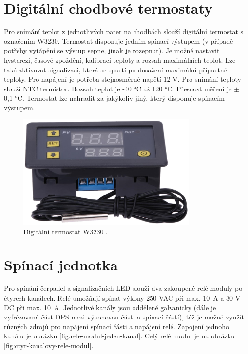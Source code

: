 \section{Digitální chodbové termostaty}
\label{digitalni-chodbove-termostaty}
Pro snímání teplot z jednotlivých pater na chodbách slouží digitální termostat s označením W3230. Termostat disponuje jedním spínací výstupem (v případě potřeby vytápění se výstup sepne, jinak je rozepnut). Je možné nastavit hysterezi, časové zpoždění, kalibraci teploty a rozsah maximálních teplot. Lze také aktivovat signalizaci, která se spustí po dosažení maximální přípustné teploty. Pro napájení je potřeba stejnosměrné napětí 12 V. Pro snímání teploty slouží NTC termistor. Rozsah teplot je -40 °C až 120 °C. Přesnost měření je $\pm$ 0,1 °C. Termostat lze nahradit za jakýkoliv jiný, který disponuje spínacím výstupem.


\begin{figure}[H]
    \centering
    \includegraphics[width=0.8\textwidth]{images/digitalni-termostat-w3230.png}
    \caption[Digitální termostat W3230.]{Digitální termostat W3230 \cite{digitalni-termostat-w3230}.}
    \label{fig:digitalni-termostat-w3230}
\end{figure}


\section{Spínací jednotka}
Pro spínání čerpadel a signalizačních LED slouží dva zakoupené relé moduly po čtyrech kanálech. Relé umožňují spínat výkony 250 VAC při max. 10~A a 30 V DC při max. 10~A. Jednotlivé kanály jsou oddělené galvanicky (dále je vyfrézovaná část DPS mezi výkonovou částí a spínací částí), též je možné využít různých zdrojů pro napájení spínací části a napájení relé. Zapojení jednoho kanálu je obrázku \ref{fig:rele-modul-jeden-kanal}. Celý relé modul je na obrázku \ref{fig:ctyr-kanalovy-rele-modul}.

